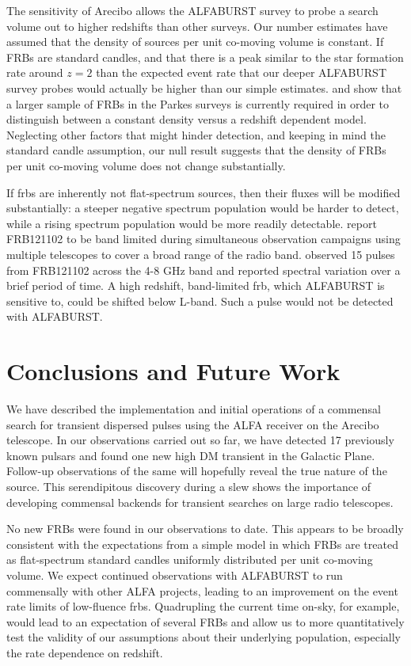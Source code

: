 \documentclass[a4paper,fleqn,usenatbib]{mnras}
\begin{document}
The sensitivity of Arecibo allows the ALFABURST survey to probe a search volume
out to higher redshifts than other surveys. Our number estimates have assumed
that the density of sources per unit co-moving volume is constant.  If FRBs
are standard candles, and that there is a peak similar to the star formation
rate around $z=2$ \citep{2014ARA&A..52..415M} than the expected event rate that
our deeper ALFABURST survey probes would actually be higher than our simple
estimates.  \citet{2016MNRAS.458..708C} and \citet{ranethesis} show that a
larger sample of FRBs in the Parkes surveys is currently required in order to
distinguish between a constant density versus a redshift dependent model.
Neglecting other factors that might hinder detection, and keeping in mind
the standard candle assumption, our null result suggests that the density of
FRBs per unit co-moving volume does not change substantially.

If \glspl{frb} are inherently not flat-spectrum sources, then their fluxes will
be modified substantially: a steeper negative spectrum population would be
harder to detect, while a rising spectrum population would be more readily
detectable.  \cite{2017arXiv170507553L} report FRB121102 to be band limited
during simultaneous observation campaigns using multiple telescopes to cover a
broad range of the radio band. \cite{atel10675} observed 15 pulses from
FRB121102 across the 4-8 GHz band and reported spectral variation over a brief
period of time. A high redshift, band-limited \gls{frb}, which ALFABURST is
sensitive to, could be shifted below L-band. Such a pulse would not be detected
with ALFABURST.

\section{Conclusions and Future Work}
\label{sec:future_work}

We have described the implementation and initial operations of a commensal
search for transient dispersed pulses using the ALFA receiver on the Arecibo
telescope. In our observations carried out so far, we have detected 17
previously known pulsars and found one new  high DM transient in the Galactic
Plane.  Follow-up observations of the same will hopefully reveal the true nature
of the source. This serendipitous discovery during a slew shows the importance
of developing commensal backends for transient searches on large radio
telescopes.

No new FRBs were found in our observations to date. This appears to be broadly
consistent with the expectations from a simple model in which FRBs are treated
as flat-spectrum standard candles uniformly distributed per unit co-moving
volume. We expect continued observations with ALFABURST to run commensally with
other ALFA projects, leading to an improvement on the event rate limits of
low-fluence \glspl{frb}. Quadrupling the current time on-sky, for example,
would lead to an expectation of several FRBs and allow us to more
quantitatively test the validity of our assumptions about their underlying
population, especially the rate dependence on redshift.
\end{document}
